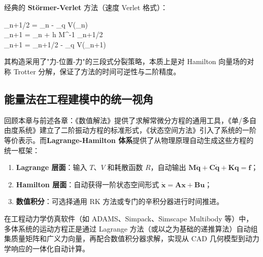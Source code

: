 经典的 \textbf{St\"{o}rmer-Verlet} 方法（速度 Verlet 格式）：
\begin{myformula}
	\begin{cases}
		_{n+1/2} = _n -  \nabla_q V(_n) \\[8pt]
		_{n+1} = _n + h M^{-1} _{n+1/2} \\[8pt]
		_{n+1} = _{n+1/2} -  \nabla_q V(_{n+1})
	\end{cases}
\end{myformula}
其构造采用了"力-位置-力"的三段式分裂策略，本质上是对 Hamilton 向量场的对称 Trotter 分解，保证了方法的时间可逆性与二阶精度。

\subsection{能量法在工程建模中的统一视角}

回顾本章与前述各章：《数值解法》提供了求解常微分方程的通用工具，《单/多自由度系统》建立了二阶振动方程的标准形式，《状态空间方法》引入了系统的一阶等价表示。而\textbf{Lagrange-Hamilton 体系}提供了从物理原理自动生成这些方程的统一框架：

\begin{enumerate}
	\item \textbf{Lagrange 层面}：输入 $T$、$V$ 和耗散函数 $R$，自动输出 $\mathbf{M}\ddot{\mathbf{q}} + \mathbf{C}\dot{\mathbf{q}} + \mathbf{K}\mathbf{q} = \mathbf{f}$；
	\item \textbf{Hamilton 层面}：自动获得一阶状态空间形式 $\dot{\mathbf{x}} = \mathbf{A}\mathbf{x} + \mathbf{B}\mathbf{u}$；
	\item \textbf{数值积分}：可选择通用 RK 方法或专门的辛积分器进行时间推进。
\end{enumerate}

\begin{remark}
	在工程动力学仿真软件（如 ADAMS、Simpack、Simscape Multibody 等）中，多体系统的运动方程正是通过 Lagrange 方法（或以之为基础的递推算法）自动组集质量矩阵和广义力向量，再配合数值积分器求解，实现从 CAD 几何模型到动力学响应的一体化自动计算。
\end{remark}
